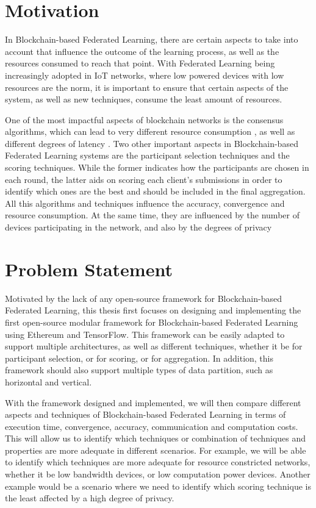 \section{Motivation}\label{intro:motivation}

In Blockchain-based Federated Learning, there are certain aspects to take into account that influence the outcome of the learning process, as well as the resources consumed to reach that point. With Federated Learning being increasingly adopted in IoT networks, where low powered devices with low resources are the norm, it is important to ensure that certain aspects of the system, as well as new techniques, consume the least amount of resources.

One of the most impactful aspects of blockchain networks is the consensus algorithms, which can lead to very different resource consumption \cite{ccaf}, as well as different degrees of latency \cite{Alqahtani_2021}. Two other important aspects in Blockchain-based Federated Learning systems are the participant selection techniques and the scoring techniques. While the former indicates how the participants are chosen in each round, the latter aids on scoring each client's submissions in order to identify which ones are the best and should be included in the final aggregation. All this algorithms and techniques influence the accuracy, convergence and resource consumption. At the same time, they are influenced by the number of devices participating in the network, and also by the degrees of privacy

\section{Problem Statement}\label{intro:problem}

Motivated by the lack of any open-source framework for Blockchain-based Federated Learning, this thesis first focuses on designing and implementing the first open-source modular framework for Blockchain-based Federated Learning using Ethereum and TensorFlow. This framework can be easily adapted to support multiple architectures, as well as different techniques, whether it be for participant selection, or for scoring, or for aggregation. In addition, this framework should also support multiple types of data partition, such as horizontal and vertical.

With the framework designed and implemented, we will then compare different aspects and techniques of Blockchain-based Federated Learning in terms of execution time, convergence, accuracy, communication and computation costs. This will allow us to identify which techniques or combination of techniques and properties are more adequate in different scenarios. For example, we will be able to identify which techniques are more adequate for resource constricted networks, whether it be low bandwidth devices, or low computation power devices. Another example would be a scenario where we need to identify which scoring technique is the least affected by a high degree of privacy.

